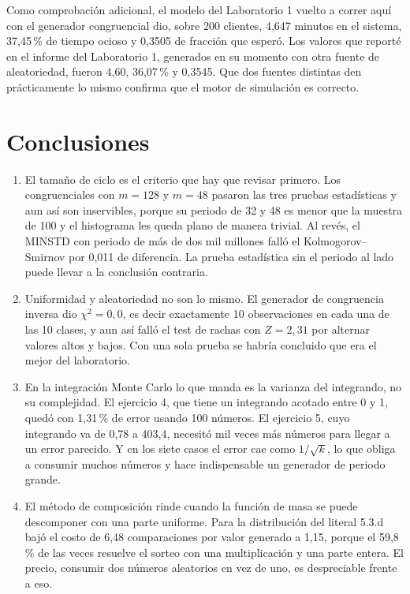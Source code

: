 \documentclass[11pt,letterpaper]{article}
\begin{document}
Como comprobación adicional, el modelo del Laboratorio 1 vuelto a correr aquí con el generador
congruencial dio, sobre 200 clientes, 4,647 minutos en el sistema, 37,45\,\% de tiempo ocioso y 0,3505
de fracción que esperó. Los valores que reporté en el informe del Laboratorio 1, generados en su
momento con otra fuente de aleatoriedad, fueron 4,60, 36,07\,\% y 0,3545. Que dos fuentes distintas
den prácticamente lo mismo confirma que el motor de simulación es correcto.

\section{Conclusiones}

\begin{enumerate}[itemsep=4pt]

\item El tamaño de ciclo es el criterio que hay que revisar primero. Los congruenciales con $m = 128$
y $m = 48$ pasaron las tres pruebas estadísticas y aun así son inservibles, porque su periodo de 32 y
48 es menor que la muestra de 100 y el histograma les queda plano de manera trivial. Al revés, el
MINSTD con periodo de más de dos mil millones falló el Kolmogorov--Smirnov por 0,011 de diferencia. La
prueba estadística sin el periodo al lado puede llevar a la conclusión contraria.

\item Uniformidad y aleatoriedad no son lo mismo. El generador de congruencia inversa dio
$\chi^2 = 0{,}0$, es decir exactamente 10 observaciones en cada una de las 10 clases, y aun así falló
el test de rachas con $Z = 2{,}31$ por alternar valores altos y bajos. Con una sola prueba se habría
concluido que era el mejor del laboratorio.

\item En la integración Monte Carlo lo que manda es la varianza del integrando, no su complejidad. El
ejercicio 4, que tiene un integrando acotado entre 0 y 1, quedó con 1,31\,\% de error usando 100
números. El ejercicio 5, cuyo integrando va de 0,78 a 403,4, necesitó mil veces más números para
llegar a un error parecido. Y en los siete casos el error cae como $1/\sqrt{k}$, lo que obliga a
consumir muchos números y hace indispensable un generador de periodo grande.

\item El método de composición rinde cuando la función de masa se puede descomponer con una
parte uniforme. Para la distribución del literal 5.3.d bajó el costo de 6,48 comparaciones por valor
generado a 1,15, porque el 59,8\,\% de las veces resuelve el sorteo con una multiplicación y una
parte entera. El precio, consumir dos números aleatorios en vez de uno, es despreciable frente a eso.


\end{enumerate}
\end{document}

